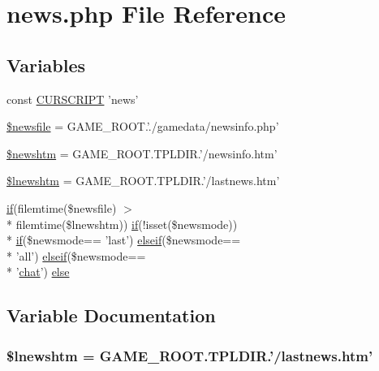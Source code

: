 \hypertarget{news_8php}{\section{news.\+php File Reference}
\label{news_8php}
}
\subsection*{Variables}
\begin{DoxyCompactItemize}
\item 
const \hyperlink{news_8php_a39c39f525eceb86cabc338804f230e80}{C\+U\+R\+S\+C\+R\+I\+P\+T} 'news'
\item 
\hyperlink{news_8php_a3636c8bd5fc9a90bdbcea8dca02021f0}{\$newsfile} = G\+A\+M\+E\+\_\+\+R\+O\+O\+T.'./gamedata/newsinfo.\+php'
\item 
\hyperlink{news_8php_a1070e769e4c48f32dfd487e7f0c564c5}{\$newshtm} = G\+A\+M\+E\+\_\+\+R\+O\+O\+T.\+T\+P\+L\+D\+I\+R.'/newsinfo.\+htm'
\item 
\hyperlink{news_8php_a7348d31c98203258eba09d81edd0d7e1}{\$lnewshtm} = G\+A\+M\+E\+\_\+\+R\+O\+O\+T.\+T\+P\+L\+D\+I\+R.'/lastnews.\+htm'
\item 
\hyperlink{login__old_8php_a4ac1118c2e44c513a674bc1793ba6c90}{if}(filemtime(\$newsfile) $>$\\*
 filemtime(\$lnewshtm)) \hyperlink{login__old_8php_a4ac1118c2e44c513a674bc1793ba6c90}{if}(!isset(\$newsmode)) \\*
\hyperlink{login__old_8php_a4ac1118c2e44c513a674bc1793ba6c90}{if}(\$newsmode== 'last') \hyperlink{urlist_8php_a77f52b43f81ed05a41b68c2161789055}{elseif}(\$newsmode== \\*
'all') \hyperlink{urlist_8php_a77f52b43f81ed05a41b68c2161789055}{elseif}(\$newsmode== \\*
'\hyperlink{game20130526_8js_aa57ded7cb1d22494c754d847f821e5cf}{chat}') \hyperlink{news_8php_a58f16d0fd6e3252121ff2eb2fa21b99d}{else}
\end{DoxyCompactItemize}


\subsection{Variable Documentation}
\hypertarget{news_8php_a7348d31c98203258eba09d81edd0d7e1}{
\subsubsection[{\$lnewshtm}]{\setlength{\rightskip}{0pt plus 5cm}\$lnewshtm = G\+A\+M\+E\+\_\+\+R\+O\+O\+T.\+T\+P\+L\+D\+I\+R.'/lastnews.\+htm'}}\label{news_8php_a7348d31c98203258eba09d81edd0d7e1}


